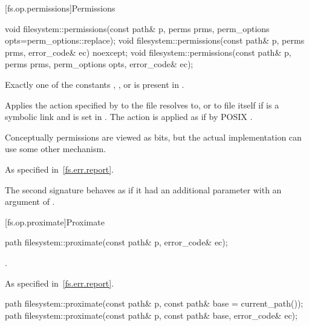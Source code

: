 [fs.op.permissions]{Permissions}

%
\begin{itemdecl}
void filesystem::permissions(const path& p, perms prms, perm_options opts=perm_options::replace);
void filesystem::permissions(const path& p, perms prms, error_code& ec) noexcept;
void filesystem::permissions(const path& p, perms prms, perm_options opts, error_code& ec);
\end{itemdecl}

\begin{itemdescr}
\pnum
\expects
Exactly one of the  constants
, , or  is present in .

\pnum
\effects
Applies the action specified by 
to the file  resolves to,
or to file  itself if  is a symbolic link
and  is set in .
The action is applied as if by POSIX .

\pnum
\begin{note}
Conceptually permissions are viewed as bits, but the actual
implementation can use some other mechanism.
\end{note}

\pnum
\throws
As specified in~\ref{fs.err.report}.

\pnum
\remarks
The second signature behaves as if it had an additional parameter
  with an argument of .
\end{itemdescr}

[fs.op.proximate]{Proximate}

%
\begin{itemdecl}
path filesystem::proximate(const path& p, error_code& ec);
\end{itemdecl}

\begin{itemdescr}
\pnum
\returns
{}.

\pnum
\throws
As specified in~\ref{fs.err.report}.
\end{itemdescr}

%
\begin{itemdecl}
path filesystem::proximate(const path& p, const path& base = current_path());
path filesystem::proximate(const path& p, const path& base, error_code& ec);
\end{itemdecl}

